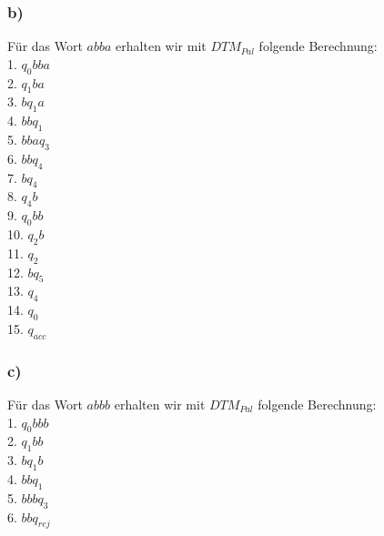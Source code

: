 \documentclass[12pt, a4paper]{article}
\begin{document}
\subsubsection*{b)}
Für das Wort \(abba\) erhalten wir mit \(DTM_{Pal}\) folgende Berechnung: \\
1. \(q_0 b b a\) \textvisiblespace\\
2. \textvisiblespace \(q_1 b a\) \textvisiblespace\\
3. \textvisiblespace \(b q_1 a\) \textvisiblespace\\
4. \textvisiblespace \(b b q_1\) \textvisiblespace\\
5. \textvisiblespace \( b b a q_3\)\\
6. \textvisiblespace \( b b q_4\) \textvisiblespace\\
7. \textvisiblespace \(b q_4\) \textvisiblespace \textvisiblespace\\
8. \textvisiblespace \(q_4 b\) \textvisiblespace \textvisiblespace\\
9. \(q_0 b b\) \textvisiblespace \textvisiblespace\\
10. \textvisiblespace \(q_2 b\) \textvisiblespace \textvisiblespace\\
11. \textvisiblespace \textvisiblespace \(q_2\) \textvisiblespace \textvisiblespace\\
12. \textvisiblespace \textvisiblespace \( b q_5\) \textvisiblespace\\
13. \textvisiblespace \textvisiblespace \(q_4\) \textvisiblespace \textvisiblespace\\
14. \textvisiblespace \(q_0\) \textvisiblespace \textvisiblespace \textvisiblespace\\
15. \textvisiblespace \textvisiblespace \(q_{acc}\) \textvisiblespace \textvisiblespace\\
\subsubsection*{c)}
Für das Wort \(abbb\) erhalten wir mit \(DTM_{Pal}\) folgende Berechnung: \\
1. \(q_0 b b b\) \textvisiblespace\\
2. \textvisiblespace \(q_1 b b \) \textvisiblespace\\
3. \textvisiblespace \(b q_1 b \) \textvisiblespace\\
4. \textvisiblespace \(b b q_1 \) \textvisiblespace\\
5. \textvisiblespace \(b b b q_3\)\\
6. \textvisiblespace \(b b q_{rej}\) \textvisiblespace\\
\end{document}
